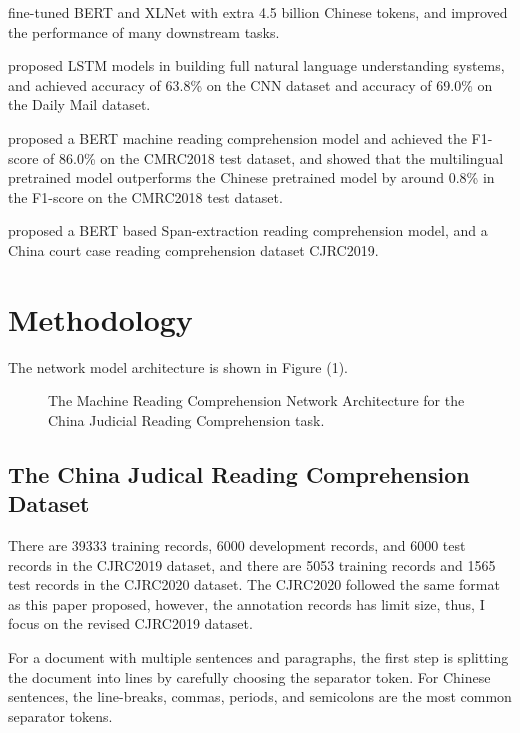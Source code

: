 \documentclass[11pt,a4paper]{article}
\begin{document}
  \citet{cui2020revisiting} fine-tuned BERT and XLNet with extra 4.5 billion Chinese tokens, and improved the performance of many downstream tasks.

  \citet{Hermann2015Teaching} proposed LSTM models in building full natural language understanding systems, and achieved accuracy of 63.8\% on the CNN dataset and accuracy of 69.0\% on the Daily Mail dataset.

  \citet{cui2019span} proposed a BERT machine reading comprehension model and achieved the F1-score of 86.0\% on the CMRC2018 test dataset,
and showed that the multilingual pretrained model outperforms the Chinese pretrained model by around 0.8\% in the F1-score on the CMRC2018 test dataset.

  \citet{duan2019cjrc} proposed a BERT based Span-extraction reading comprehension model, and a China court case reading comprehension dataset CJRC2019.

\section{Methodology}
\label{sec:hireachy}

The network model architecture is shown in Figure (1).

\begin{figure*}
\begin{center}
\end{center}
   \caption{The Machine Reading Comprehension Network Architecture for the China Judicial Reading Comprehension task.}
\label{fig:short}
\end{figure*}

\subsection{The China Judical Reading Comprehension Dataset}

    There are 39333 training records, 6000 development records, and 6000 test records in the CJRC2019 dataset,
and there are 5053 training records and 1565 test records in the CJRC2020 dataset.
    The CJRC2020 followed the same format as this paper proposed, however, the annotation records has limit size, thus, I focus on the revised CJRC2019 dataset.

    For a document with multiple sentences and paragraphs, the first step is splitting the document into lines by carefully choosing the separator token.
    For Chinese sentences, the line-breaks, commas, periods, and semicolons are the most common separator tokens.
\end{document}
